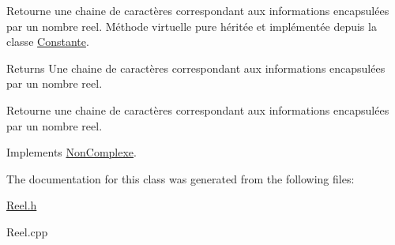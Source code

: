 \-Retourne une chaine de caractères correspondant aux informations encapsulées par un nombre reel. \-Méthode virtuelle pure héritée et implémentée depuis la classe \hyperlink{classConstante}{\-Constante}. 

\begin{DoxyReturn}{\-Returns}
\-Une chaine de caractères correspondant aux informations encapsulées par un nombre reel.
\end{DoxyReturn}
\-Retourne une chaine de caractères correspondant aux informations encapsulées par un nombre reel. 

\-Implements \hyperlink{classNonComplexe_abae1947a8f9f582f94d5e791ce4624d6}{\-Non\-Complexe}.



\-The documentation for this class was generated from the following files\-:\begin{DoxyCompactItemize}
\item 
\hyperlink{Reel_8h}{\-Reel.\-h}\item 
\-Reel.\-cpp\end{DoxyCompactItemize}
